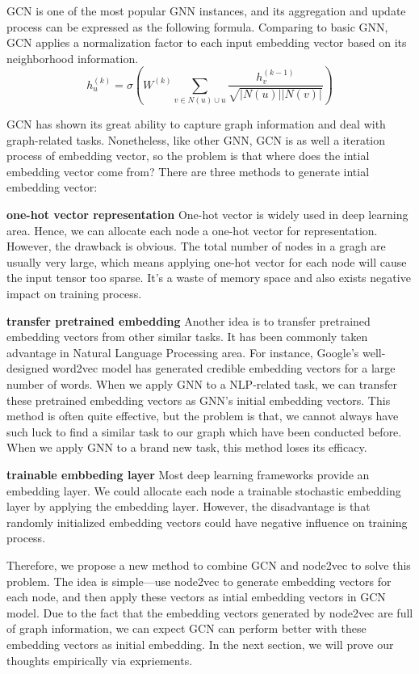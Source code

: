 \documentclass[sigconf]{acmart}
\begin{document}
GCN is one of the most popular GNN instances, and its aggregation and update process can be expressed as the following formula. Comparing to basic GNN, GCN applies a normalization factor to each input embedding vector based on its neighborhood information.
$$h_u^{(k)}=\sigma (W^{(k)}\sum_{v\in N(u)\cup u}\frac{h_v^{(k-1)}}{\sqrt{|N(u)||N(v)|}})$$ 

GCN has shown its great ability to capture graph information and deal with graph-related tasks. Nonetheless, like other GNN, GCN is as well a iteration process of embedding vector, so the problem is that where does the intial embedding vector come from? There are three methods to generate intial embedding vector:

\textbf{one-hot vector representation} One-hot vector is widely used in deep learning area. Hence, we can allocate each node a one-hot vector for representation. However, the drawback is obvious. The total number of nodes in a gragh are usually very large, which means applying one-hot vector for each node will cause the input tensor too sparse. It's a waste of memory space and also exists negative impact on training process.

\textbf{transfer pretrained embedding} Another idea is to transfer pretrained embedding vectors from other similar tasks. It has been commonly taken advantage in Natural Language Processing area. For instance, Google's well-designed word2vec model \cite{word2vec} has generated credible embedding vectors for a large number of words. When we apply GNN to a NLP-related task, we can transfer these pretrained embedding vectors as GNN's initial embedding vectors. This method is often quite effective, but the problem is that, we cannot always have such luck to find a similar task to our graph which have been conducted before. When we apply GNN to a brand new task, this method loses its efficacy.

\textbf{trainable embbeding layer} Most deep learning frameworks provide an embedding layer. We could allocate each node a trainable stochastic embedding layer by applying the embedding layer. However, the disadvantage is that randomly initialized embedding vectors could have negative influence on training process.

Therefore, we propose a new method to combine GCN and node2vec to solve this problem. The idea is simple---use node2vec to generate embedding vectors for each node, and then apply these vectors as intial embedding vectors in GCN model. Due to the fact that the embedding vectors generated by node2vec are full of graph information, we can expect GCN can perform better with these embedding vectors as initial embedding. In the next section, we will prove our thoughts empirically via expriements. 
\end{document}
